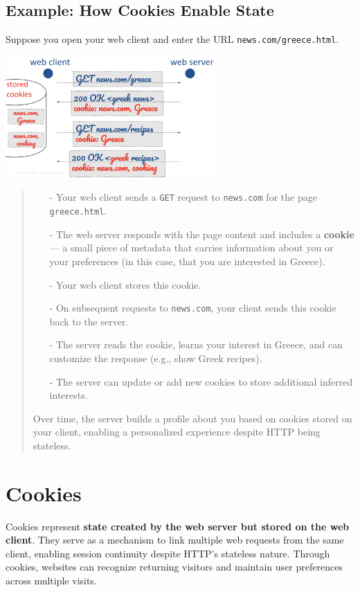 \documentclass[../../compsys.tex]{subfiles}
\begin{document}
\subsection{Example: How Cookies Enable State}
Suppose you open your web client and enter the URL \texttt{news.com/greece.html}.
\begin{center}
    \includegraphics[width=0.6\textwidth]{images/cooking.png}
\end{center}
\begin{quote}
\begin{itemize}
    \item[-] Your web client sends a \texttt{GET} request to \texttt{news.com} for the page \texttt{greece.html}.
    \item[-] The web server responds with the page content and includes a \textbf{cookie} — a small piece of metadata that carries information about you or your preferences (in this case, that you are interested in Greece).
    \item[-] Your web client stores this cookie.
    \item[-] On subsequent requests to \texttt{news.com}, your client sends this cookie back to the server.
    \item[-] The server reads the cookie, learns your interest in Greece, and can customize the response (e.g., show Greek recipes).
    \item[-] The server can update or add new cookies to store additional inferred interests.
\end{itemize}

Over time, the server builds a profile about you based on cookies stored on your client, enabling a personalized experience despite HTTP being stateless.
\end{quote}

\section{Cookies}
Cookies represent \textbf{state created by the web server but stored on the web client}. They serve as a mechanism to link multiple web requests from the same client, enabling session continuity despite HTTP's stateless nature. Through cookies, websites can recognize returning visitors and maintain user preferences across multiple visits.
\end{document}
